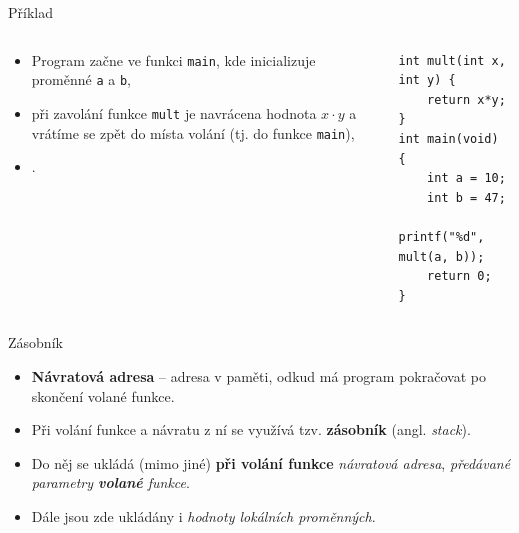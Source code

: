 \documentclass[14pt,aspectratio=169]{beamer}
\begin{document}
    \begin{frame}[t,fragile]{Příklad}
        \begin{columns}[onlytextwidth]
            \begin{column}{0.55\textwidth}
                \begin{itemize}
                    \item Program začne ve funkci \texttt{main}, kde inicializuje proměnné \texttt{a} a \texttt{b},
                    \item při zavolání funkce \texttt{mult} je navrácena hodnota $x\cdot y$ a vrátíme se zpět do místa volání (tj. do funkce \texttt{main}),
                    \item {} .
                \end{itemize}
            \end{column}
            
            \begin{column}{0.41\textwidth}
                \begin{lstlisting}
int mult(int x, int y) {
    return x*y;
}
int main(void) {
    int a = 10;
    int b = 47;
    printf("%d", mult(a, b));
    return 0;
}
                \end{lstlisting}
            \end{column}
        \end{columns}
        
    \end{frame}

    \begin{frame}[t]{Zásobník}
        \begin{itemize}
            \item \textbf{Návratová adresa} -- adresa v paměti, odkud má program pokračovat po skončení volané funkce.
            \item Při volání funkce a návratu z ní se využívá tzv. \textbf{zásobník} (angl. \emph{stack}).
            \item Do něj se ukládá (mimo jiné) \textbf{při volání funkce} \emph{návratová adresa}, \emph{předávané parametry \textbf{volané} funkce}.
            \item Dále jsou zde ukládány i \emph{hodnoty lokálních proměnných}.
        \end{itemize}
    \end{frame}
\end{document}
